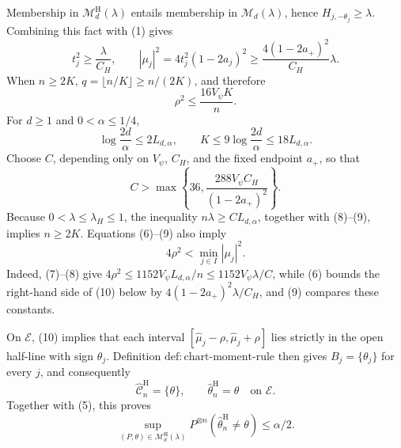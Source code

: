 Membership in \(\mathcal M_d^{\mathrm H}(\lambda)\) entails membership in \(\mathcal M_d(\lambda)\), hence \(H_{j,-\theta_j}\ge\lambda\).  Combining this fact with (1) gives
\[
t_j^2\ge\frac{\lambda}{C_H},
\qquad
|\mu_j|^2=4t_j^2(1-2a_j)^2
\ge \frac{4(1-2a_+)^2}{C_H}\lambda.
\tag{6}
\]
When \(n\ge2K\), \(q=\lfloor n/K\rfloor\ge n/(2K)\), and therefore
\[
\rho^2\le\frac{16V_\psi K}{n}.
\tag{7}
\]
For \(d\ge1\) and \(0<\alpha\le1/4\),
\[
\log\frac{2d}{\alpha}\le2L_{d,\alpha},
\qquad
K\le9\log\frac{2d}{\alpha}\le18L_{d,\alpha}.
\tag{8}
\]
Choose \(C\), depending only on \(V_\psi\), \(C_H\), and the fixed endpoint \(a_+\), so that
\[
C>\max\left\{36,\frac{288V_\psi C_H}{(1-2a_+)^2}\right\}.
\tag{9}
\]
Because \(0<\lambda\le\lambda_H\le1\), the inequality \(n\lambda\ge CL_{d,\alpha}\), together with (8)--(9), implies \(n\ge2K\).  Equations (6)--(9) also imply
\[
4\rho^2<\min_{j\in I}|\mu_j|^2.
\tag{10}
\]
Indeed, (7)--(8) give \(4\rho^2\le1152V_\psi L_{d,\alpha}/n\le1152V_\psi\lambda/C\), while (6) bounds the right-hand side of (10) below by \(4(1-2a_+)^2\lambda/C_H\), and (9) compares these constants.

On \(\mathcal E\), (10) implies that each interval \([\widehat\mu_j-\rho,\widehat\mu_j+\rho]\) lies strictly in the open half-line with sign \(\theta_j\).  Definition \(\mathrm{def:chart\text{-}moment\text{-}rule}\) then gives \(B_j=\{\theta_j\}\) for every \(j\), and consequently
\[
\widehat{\mathcal C}_n^{\mathrm H}=\{\theta\},
\qquad
\widehat\theta_n^{\mathrm H}=\theta
\quad\text{on }\mathcal E.
\]
Together with (5), this proves
\[
\sup_{(P,\theta)\in\mathcal M_d^{\mathrm H}(\lambda)}
P^{\otimes n}(\widehat\theta_n^{\mathrm H}\ne\theta)
\le\alpha/2.
\tag{11}
\]

